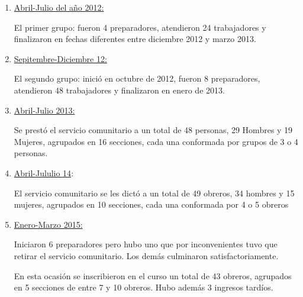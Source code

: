             \begin{enumerate}
                \item \underline{Abril-Julio del año 2012:} 
                
                El primer grupo: fueron 4 preparadores, atendieron 24 trabajadores y finalizaron en fechas diferentes entre diciembre 2012 y marzo 2013.
                
                \item \underline{Sepitembre-Diciembre 12:}
                
                El segundo grupo: inició en octubre de 2012, fueron 8 preparadores, atendieron 48 trabajadores y finalizaron en enero de 2013.
                
                \item \underline{Abril-Julio 2013:}
                
                Se prestó el servicio comunitario a un total de 48 personas, 29  Hombres y 19 Mujeres,  agrupados en 16 secciones, cada una conformada por grupos de 3 o 4 personas.
               
                \item \underline{Abril-Jululio 14}:
                
                El servicio comunitario se les dictó a un total de 49 obreros, 34 hombres y 15 mujeres, agrupados en 10 secciones, cada una conformada por 4 o 5 obreros
                
                \item \underline{Enero-Marzo 2015:}
                
                Iniciaron 6 preparadores pero hubo uno que por inconvenientes tuvo que retirar el servicio comunitario. Los demás culminaron satisfactoriamente.
                
                En esta ocasión se inscribieron en el curso un total de 43 obreros, agrupados en 5 secciones de entre 7 y 10 obreros. Hubo además 3 ingresos tardíos.
            \end{enumerate}
            
	\pagebreak